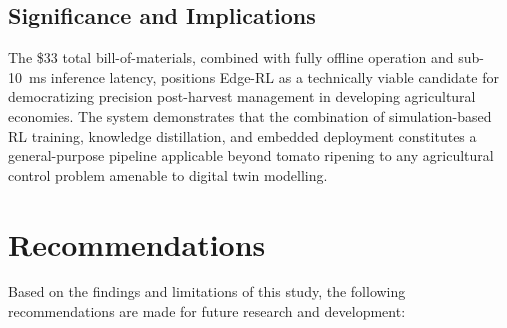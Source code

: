     \subsection{Significance and Implications}

    The \$33 total bill-of-materials, combined with fully offline operation and sub-10~ms inference latency, positions Edge-RL as a technically viable candidate for democratizing precision post-harvest management in developing agricultural economies. The system demonstrates that the combination of simulation-based RL training, knowledge distillation, and embedded deployment constitutes a general-purpose pipeline applicable beyond tomato ripening to any agricultural control problem amenable to digital twin modelling.



\section{Recommendations}
    \label{sec:Recommendations}

    Based on the findings and limitations of this study, the following recommendations are made for future research and development:

